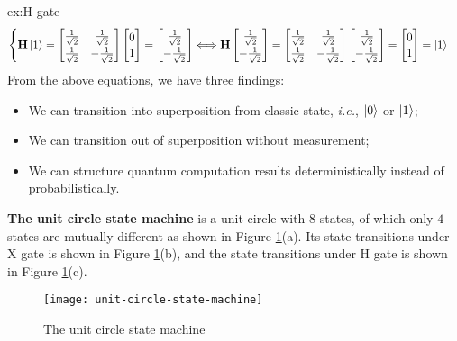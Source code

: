 \documentclass{easyclass}
\begin{document}
\begin{example}{ex:H gate}
\begin{equation}
\begin{cases}
			\mathbf{H}\ket{1}=
			\begin{bmatrix}
				\frac{1}{\sqrt{2}} & \frac{1}{\sqrt{2}}\\
				\frac{1}{\sqrt{2}} & -\frac{1}{\sqrt{2}}
			\end{bmatrix} 
			\begin{bmatrix}
				0 \\ 1
			\end{bmatrix}=
			\begin{bmatrix}
				\frac{1}{\sqrt{2}} \\ -\frac{1}{\sqrt{2}}
			\end{bmatrix}
			\Longleftrightarrow
			\mathbf{H}\begin{bmatrix}
				\frac{1}{\sqrt{2}} \\ -\frac{1}{\sqrt{2}}
			\end{bmatrix}=
			\begin{bmatrix}
				\frac{1}{\sqrt{2}} & \frac{1}{\sqrt{2}}\\
				\frac{1}{\sqrt{2}} & -\frac{1}{\sqrt{2}}
			\end{bmatrix} 
			\begin{bmatrix}
				\frac{1}{\sqrt{2}} \\ -\frac{1}{\sqrt{2}}
			\end{bmatrix}=
			\begin{bmatrix}
				0 \\ 1
			\end{bmatrix}=\ket{1}
		\\
		\end{cases}
	\end{equation}
	From the above equations, we have three findings:
	\begin{itemize}
		\item We can transition into superposition from classic state, \textit{i.e.}, $\ket{0}$ or $\ket{1}$;
		\item We can transition out of superposition without measurement;
		\item We can structure quantum computation results deterministically instead of probabilistically.
	\end{itemize}
\end{example}


\textbf{The unit circle state machine} is a unit circle with $8$ states, of which only $4$ states are mutually different as shown in Figure \ref{fig:unit circle state machine}(a). Its state transitions under X gate is shown in Figure \ref{fig:unit circle state machine}(b), and the state transitions under H gate is shown in Figure \ref{fig:unit circle state machine}(c).
\begin{figure}[h]
	\centering
	\texttt{[image: unit-circle-state-machine]}
	\caption{The unit circle state machine}
	\label{fig:unit circle state machine}
\end{figure}
\end{document}
